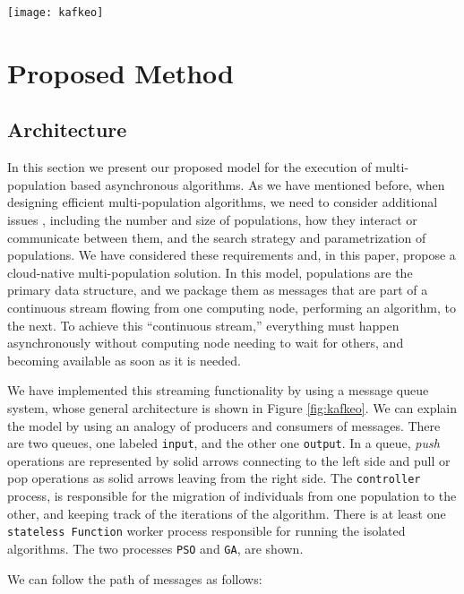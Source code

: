 \begin{figure*}
\texttt{[image: kafkeo]}
\caption{A sample black and white graphic
that needs to span two columns of text.}
\label{fig:kafkeo}
\end{figure*}

\section{Proposed Method}
\label{method}

\subsection{Architecture}
\label{arch}

In this section we present our proposed model for the execution of
multi-population based asynchronous algorithms. As we have mentioned before, when
designing efficient multi-population algorithms, we need to consider additional
issues \cite{Ma2019}, including the number and size of populations, how they
interact or communicate between them, and the search strategy and parametrization of
populations. We have considered these requirements and, in this paper,
propose a cloud-native
multi-population solution. In this model, populations are the primary data
structure, and we package them as messages that are part of a continuous stream flowing
from one computing node, performing an algorithm, to the next. To achieve this ``continuous stream,''
everything must happen asynchronously without computing node needing to wait for
others, and becoming available as soon as it is needed.

We have implemented this streaming functionality by using a message queue
system, whose general architecture is shown in Figure \ref{fig:kafkeo}. We can explain
the model by using an analogy of producers and consumers of messages. There are
two queues, one labeled \texttt{input}, and the other one \texttt{output}. In a
queue, {\em push} operations are represented by solid arrows connecting to the
left side and pull or pop operations as solid arrows leaving from the right
side. The \texttt{controller} process, is responsible for the migration of
individuals from one population to the other, and keeping track of the
iterations of the algorithm. There is at least one \texttt{stateless Function}
worker process responsible for running the isolated algorithms. The two
processes \texttt{PSO} and \texttt{GA}, are shown.

We can follow the path of messages as follows:

